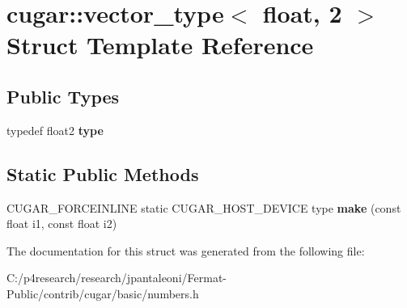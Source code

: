 \hypertarget{structcugar_1_1vector__type_3_01float_00_012_01_4}{}\section{cugar\+:\+:vector\+\_\+type$<$ float, 2 $>$ Struct Template Reference}
\label{structcugar_1_1vector__type_3_01float_00_012_01_4}
\subsection*{Public Types}
\begin{DoxyCompactItemize}
\item 
\mbox{\label{structcugar_1_1vector__type_3_01float_00_012_01_4_a7412fc81513343469c50f7253a2ba6aa}} 
typedef float2 {\bfseries type}
\end{DoxyCompactItemize}
\subsection*{Static Public Methods}
\begin{DoxyCompactItemize}
\item 
\mbox{\label{structcugar_1_1vector__type_3_01float_00_012_01_4_a8d4ee3b440d37db0e2333fb2d6b09089}} 
C\+U\+G\+A\+R\+\_\+\+F\+O\+R\+C\+E\+I\+N\+L\+I\+NE static C\+U\+G\+A\+R\+\_\+\+H\+O\+S\+T\+\_\+\+D\+E\+V\+I\+CE type {\bfseries make} (const float i1, const float i2)
\end{DoxyCompactItemize}


The documentation for this struct was generated from the following file\+:\begin{DoxyCompactItemize}
\item 
C\+:/p4research/research/jpantaleoni/\+Fermat-\/\+Public/contrib/cugar/basic/numbers.\+h\end{DoxyCompactItemize}
